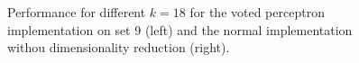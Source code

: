 \documentclass[12pt]{article}
\begin{document}
\begin{figure}[H]
	\centering
	\hspace{1pt}
	\caption[]{Performance for different $k=18$ for the voted perceptron implementation on set 9 (left) and the normal implementation withou dimensionality reduction (right).}
	\label{fig:6.2}
\end{figure}

%	



\end{document}
